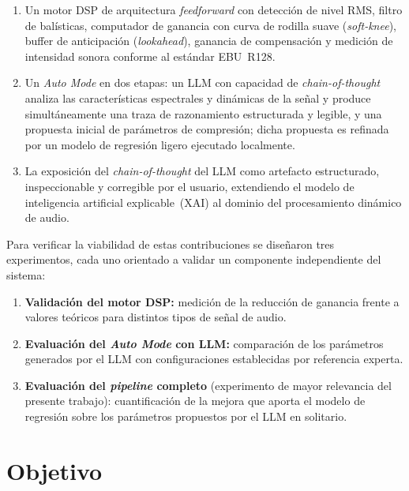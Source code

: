 \documentclass[a4paper,12pt]{article}
\begin{document}
\begin{enumerate}
    \item Un motor DSP de arquitectura \textit{feedforward} con detección de nivel
          RMS, filtro de balísticas, computador de ganancia con curva de rodilla
          suave (\textit{soft-knee}), buffer de anticipación (\textit{lookahead}),
          ganancia de compensación y medición de intensidad sonora conforme al
          estándar EBU~R128.

    \item Un \textit{Auto Mode} en dos etapas: un LLM con capacidad de
          \textit{chain-of-thought} analiza las características espectrales y
          dinámicas de la señal y produce simultáneamente una traza de razonamiento
          estructurada y legible, y una propuesta inicial de parámetros de
          compresión; dicha propuesta es refinada por un modelo de regresión
          ligero ejecutado localmente.

    \item La exposición del \textit{chain-of-thought} del LLM como artefacto
          estructurado, inspeccionable y corregible por el usuario, extendiendo
          el modelo de inteligencia artificial explicable~(XAI) al dominio del
          procesamiento dinámico de audio.
\end{enumerate}

Para verificar la viabilidad de estas contribuciones se diseñaron tres experimentos,
cada uno orientado a validar un componente independiente del sistema:

\begin{enumerate}
    \item \textbf{Validación del motor DSP:} medición de la reducción de ganancia
          frente a valores teóricos para distintos tipos de señal de audio.

    \item \textbf{Evaluación del \textit{Auto Mode} con LLM:} comparación de los
          parámetros generados por el LLM con configuraciones establecidas por
          referencia experta.

    \item \textbf{Evaluación del \textit{pipeline} completo} (experimento de mayor
          relevancia del presente trabajo): cuantificación de la mejora que aporta
          el modelo de regresión sobre los parámetros propuestos por el LLM
          en solitario.
\end{enumerate}

\section{Objetivo}
\label{sec:objetivo}
\end{document}
